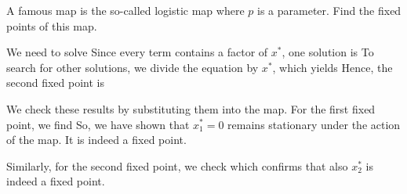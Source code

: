 A famous map is the so-called logistic map 
where $p$ is a parameter. Find the fixed points of this map. 

\solution
We need to solve 
Since every term contains a factor of $x^*$, one solution is 
To search for other solutions, we divide the equation by $x^*$, which yields
Hence, the second fixed point is 

We check these results by substituting them into the map. For the first fixed point, we find 
So, we have shown that $x_1^*=0$ remains stationary under the action of the map. It is indeed a fixed point. 

Similarly, for the second fixed point, we check
which confirms that also $x_2^*$ is indeed a fixed point.

